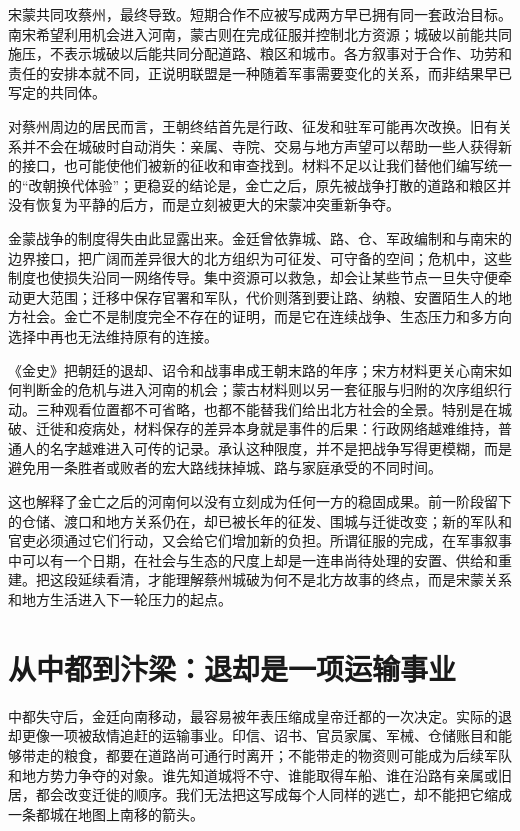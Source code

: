 宋蒙共同攻蔡州，最终导致。短期合作不应被写成两方早已拥有同一套政治目标。南宋希望利用机会进入河南，蒙古则在完成征服并控制北方资源；城破以前能共同施压，不表示城破以后能共同分配道路、粮区和城市。各方叙事对于合作、功劳和责任的安排本就不同，正说明联盟是一种随着军事需要变化的关系，而非结果早已写定的共同体。

对蔡州周边的居民而言，王朝终结首先是行政、征发和驻军可能再次改换。旧有关系并不会在城破时自动消失：亲属、寺院、交易与地方声望可以帮助一些人获得新的接口，也可能使他们被新的征收和审查找到。材料不足以让我们替他们编写统一的“改朝换代体验”；更稳妥的结论是，金亡之后，原先被战争打散的道路和粮区并没有恢复为平静的后方，而是立刻被更大的宋蒙冲突重新争夺。

金蒙战争的制度得失由此显露出来。金廷曾依靠城、路、仓、军政编制和与南宋的边界接口，把广阔而差异很大的北方组织为可征发、可守备的空间；危机中，这些制度也使损失沿同一网络传导。集中资源可以救急，却会让某些节点一旦失守便牵动更大范围；迁移中保存官署和军队，代价则落到要让路、纳粮、安置陌生人的地方社会。金亡不是制度完全不存在的证明，而是它在连续战争、生态压力和多方向选择中再也无法维持原有的连接。

《金史》把朝廷的退却、诏令和战事串成王朝末路的年序；宋方材料更关心南宋如何判断金的危机与进入河南的机会；蒙古材料则以另一套征服与归附的次序组织行动。三种观看位置都不可省略，也都不能替我们给出北方社会的全景。特别是在城破、迁徙和疫病处，材料保存的差异本身就是事件的后果：行政网络越难维持，普通人的名字越难进入可传的记录。承认这种限度，并不是把战争写得更模糊，而是避免用一条胜者或败者的宏大路线抹掉城、路与家庭承受的不同时间。

这也解释了金亡之后的河南何以没有立刻成为任何一方的稳固成果。前一阶段留下的仓储、渡口和地方关系仍在，却已被长年的征发、围城与迁徙改变；新的军队和官吏必须通过它们行动，又会给它们增加新的负担。所谓征服的完成，在军事叙事中可以有一个日期，在社会与生态的尺度上却是一连串尚待处理的安置、供给和重建。把这段延续看清，才能理解蔡州城破为何不是北方故事的终点，而是宋蒙关系和地方生活进入下一轮压力的起点。

\section{从中都到汴梁：退却是一项运输事业}

中都失守后，金廷向南移动，最容易被年表压缩成皇帝迁都的一次决定。实际的退却更像一项被敌情追赶的运输事业。印信、诏书、官员家属、军械、仓储账目和能够带走的粮食，都要在道路尚可通行时离开；不能带走的物资则可能成为后续军队和地方势力争夺的对象。谁先知道城将不守、谁能取得车船、谁在沿路有亲属或旧居，都会改变迁徙的顺序。我们无法把这写成每个人同样的逃亡，却不能把它缩成一条都城在地图上南移的箭头。

